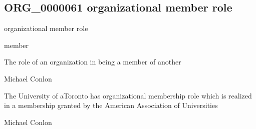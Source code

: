 \documentclass[letterpaper,10pt,english]{sphinxmanual}
\begin{document}
\subsection{ORG\_0000061 \sphinxhyphen{} organizational member role}
\label{\detokenize{doc-ORG_0000061:org-0000061-organizational-member-role}}\label{\detokenize{doc-ORG_0000061:index-0}}\label{\detokenize{doc-ORG_0000061::doc}}
\begin{sphinxShadowBox}

\sphinxAtStartPar
organizational member role
\end{sphinxShadowBox}

\begin{sphinxShadowBox}

\sphinxAtStartPar
member
\end{sphinxShadowBox}

\begin{sphinxShadowBox}

\sphinxAtStartPar
{\hyperref[\detokenize{doc-BFO_0000023::doc}]{}}
\end{sphinxShadowBox}

\begin{sphinxShadowBox}

\sphinxAtStartPar
The role of an organization in being a member of another
\end{sphinxShadowBox}

\begin{sphinxShadowBox}

\sphinxAtStartPar
Michael Conlon 
\end{sphinxShadowBox}

\begin{sphinxShadowBox}

\sphinxAtStartPar
The University of aToronto has organizational membership role which is realized in a membership granted by the American Association of Universities
\end{sphinxShadowBox}

\begin{sphinxShadowBox}

\sphinxAtStartPar
Michael Conlon 
\end{sphinxShadowBox}
\begin{quote}

\ignorespaces \end{quote}
\end{document}
